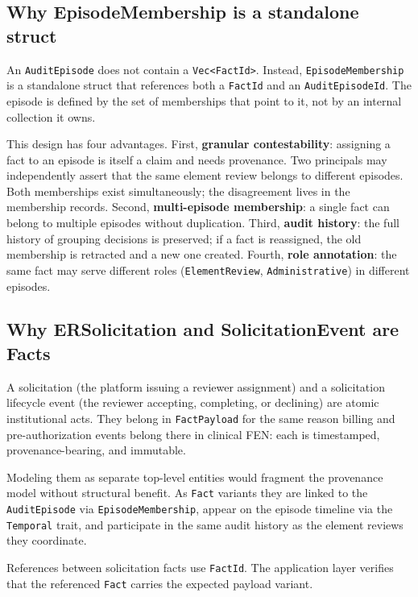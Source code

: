 \documentclass[11pt]{article}
\begin{document}
\subsection{Why EpisodeMembership is a standalone struct}
\label{sec:membership-rationale}

An \texttt{AuditEpisode} does not contain a \texttt{Vec<FactId>}. Instead,
\texttt{EpisodeMembership} is a standalone struct that references both a
\texttt{FactId} and an \texttt{AuditEpisodeId}. The episode is defined by the
set of memberships that point to it, not by an internal collection it owns.

This design has four advantages. First, \textbf{granular contestability}:
assigning a fact to an episode is itself a claim and needs provenance. Two
principals may independently assert that the same element review belongs to
different episodes. Both memberships exist simultaneously; the disagreement
lives in the membership records. Second, \textbf{multi-episode membership}: a
single fact can belong to multiple episodes without duplication. Third,
\textbf{audit history}: the full history of grouping decisions is preserved;
if a fact is reassigned, the old membership is retracted and a new one created.
Fourth, \textbf{role annotation}: the same fact may serve different roles
(\texttt{ElementReview}, \texttt{Administrative}) in different episodes.

\subsection{Why ERSolicitation and SolicitationEvent are Facts}
\label{sec:solicitation-rationale}

A solicitation (the platform issuing a reviewer assignment) and a solicitation
lifecycle event (the reviewer accepting, completing, or declining) are atomic
institutional acts. They belong in \texttt{FactPayload} for the same reason
billing and pre-authorization events belong there in clinical FEN: each is
timestamped, provenance-bearing, and immutable.

Modeling them as separate top-level entities would fragment the provenance
model without structural benefit. As \texttt{Fact} variants they are linked to
the \texttt{AuditEpisode} via \texttt{EpisodeMembership}, appear on the episode
timeline via the \texttt{Temporal} trait, and participate in the same audit
history as the element reviews they coordinate.

References between solicitation facts use \texttt{FactId}. The application
layer verifies that the referenced \texttt{Fact} carries the expected payload
variant.
\end{document}
